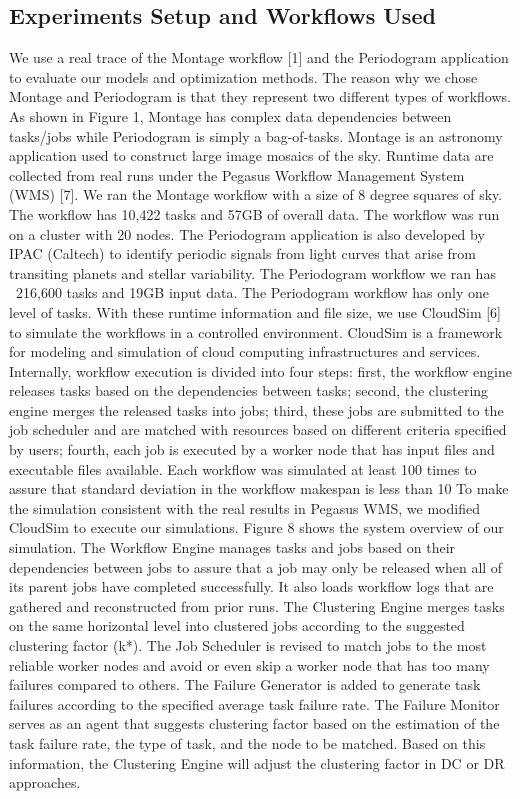 \documentclass{IOS-Book-Article}
\begin{document}
\subsection{Experiments Setup and Workflows Used}
We use a real trace of the Montage workflow [1] and the Periodogram application to evaluate our models and optimization methods. The reason why we chose Montage and Periodogram is that they represent two different types of workflows. As shown in Figure 1, Montage has complex data dependencies between tasks/jobs while Periodogram is simply a bag-of-tasks. Montage is an astronomy application used to construct large image mosaics of the sky.  Runtime data are collected from real runs under the Pegasus Workflow Management System (WMS) [7]. We ran the Montage workflow with a size of 8 degree squares of sky. The workflow has 10,422 tasks and 57GB of overall data. The workflow was run on a cluster with 20 nodes. The Periodogram application is also developed by IPAC (Caltech) to identify periodic signals from light curves that arise from transiting planets and stellar variability. The Periodogram workflow we ran has ~216,600 tasks and 19GB input data. The Periodogram workflow has only one level of tasks. 
With these runtime information and file size, we use CloudSim [6] to simulate the workflows in a controlled environment.  CloudSim is a framework for modeling and simulation of cloud computing infrastructures and services. Internally, workflow execution is divided into four steps: first, the workflow engine releases tasks based on the dependencies between tasks; second, the clustering engine merges the released tasks into jobs; third, these jobs are submitted to the job scheduler and are matched with resources based on different criteria specified by users; fourth, each job is executed by a worker node that has input files and executable files available. Each workflow was simulated at least 100 times to assure that standard deviation in the workflow makespan is less than 10%
To make the simulation consistent with the real results in Pegasus WMS, we modified CloudSim to execute our simulations.  Figure 8 shows the system overview of our simulation. The Workflow Engine manages tasks and jobs based on their dependencies between jobs to assure that a job may only be released when all of its parent jobs have completed successfully. It also loads workflow logs that are gathered and reconstructed from prior runs. The Clustering Engine merges tasks on the same horizontal level into clustered jobs according to the suggested clustering factor (k*). The Job Scheduler is revised to match jobs to the most reliable worker nodes and avoid or even skip a worker node that has too many failures compared to others. The Failure Generator is added to generate task failures according to the specified average task failure rate. The Failure Monitor serves as an agent that suggests clustering factor based on the estimation of the task failure rate, the type of task, and the node to be matched. Based on this information, the Clustering Engine will adjust the clustering factor in DC or DR approaches.
 
\end{document}
